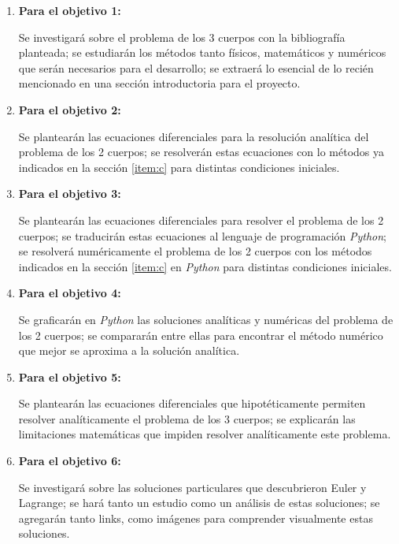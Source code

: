 \documentclass[proyecto.tex]{subfiles}
\begin{document}
\begin{enumerate}
    \item \textbf{Para el objetivo 1:}
    
    \par Se investigará sobre el problema de los 3 cuerpos con la bibliografía planteada; se estudiarán los métodos tanto físicos, matemáticos y numéricos que serán necesarios para el desarrollo; se extraerá lo esencial de lo recién mencionado en una sección introductoria para el proyecto.
    
    \item \textbf{Para el objetivo 2:}
    
    \par Se plantearán las ecuaciones diferenciales para la resolución analítica del problema de los 2 cuerpos; se resolverán estas ecuaciones con lo métodos ya indicados en la sección \ref{item:c} para distintas condiciones iniciales.
    
    \item \textbf{Para el objetivo 3:}
    
    \par Se plantearán las ecuaciones diferenciales para resolver el problema de los 2 cuerpos; se traducirán estas ecuaciones al lenguaje de programación \textit{Python}; se resolverá numéricamente el problema de los 2 cuerpos con los métodos indicados en la sección \ref{item:c} en \textit{Python} para distintas condiciones iniciales.
    
    \item \textbf{Para el objetivo 4:}
    
    \par Se graficarán en \textit{Python} las soluciones analíticas y numéricas del problema de los 2 cuerpos; se compararán entre ellas para encontrar el método numérico que mejor se aproxima a la solución analítica.
    
    \item \textbf{Para el objetivo 5:}
    
    \par Se plantearán las ecuaciones diferenciales que hipotéticamente permiten resolver analíticamente el problema de los 3 cuerpos; se explicarán las limitaciones matemáticas que impiden resolver analíticamente este problema.
    
    \item \textbf{Para el objetivo 6:}
    
    \par Se investigará sobre las soluciones particulares que descubrieron Euler y Lagrange; se hará tanto un estudio como un análisis de estas soluciones; se agregarán tanto links, como imágenes para comprender visualmente estas soluciones.
    

\end{enumerate}
\end{document}
